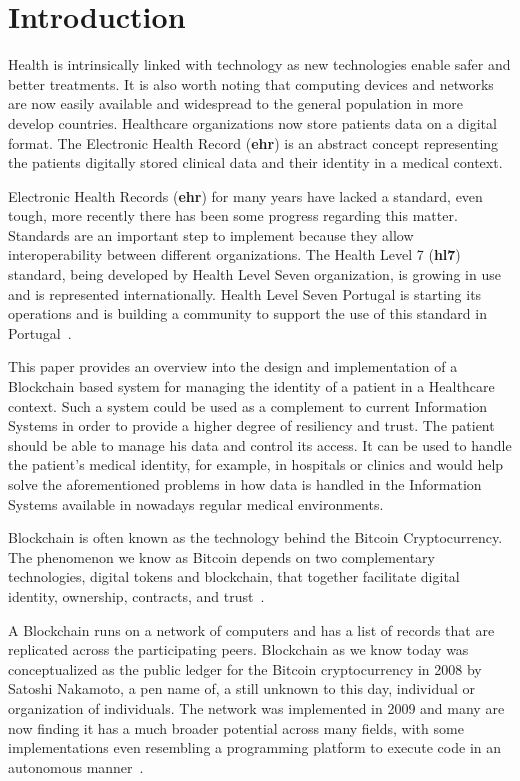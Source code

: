 \chapter{Introduction}\label{introduction}

Health is intrinsically linked with technology as new technologies enable safer
and better treatments. It is also worth noting that computing devices and
networks are now easily available and widespread to the general population in
more develop countries. Healthcare organizations now store patients data on a
digital format. The Electronic Health Record (\textbf{ehr}) is an abstract
concept representing the patients digitally stored clinical data and their
identity in a medical context.

Electronic Health Records (\textbf{ehr}) for many years have lacked a standard,
even tough, more recently there has been some progress regarding this matter.
Standards are an important step to implement because they allow
interoperability between different organizations. The Health Level 7
(\textbf{hl7}) standard, being developed by Health Level Seven organization, is
growing in use and is represented internationally. Health Level Seven Portugal
is starting its operations and is building a community to support the use of
this standard in Portugal~\cite{HealthLevel7}.

This paper provides an overview into the design and implementation of a
Blockchain based system for managing the identity of a patient in a Healthcare
context. Such a system could be used as a complement to current Information
Systems in order to provide a higher degree of resiliency and trust. The
patient should be able to manage his data and control its access. It can be
used to handle the patient’s medical identity, for example, in hospitals or
clinics and would help solve the aforementioned problems in how data is handled
in the Information Systems available in nowadays regular medical environments.

Blockchain is often known as the technology behind the Bitcoin Cryptocurrency.
The phenomenon we know as Bitcoin depends on two complementary technologies,
digital tokens and blockchain, that together facilitate digital identity,
ownership, contracts, and trust~\cite{Evans2016}.

A Blockchain runs on a network of computers and has a list of records that are
replicated across the participating peers. Blockchain as we know today was
conceptualized as the public ledger for the Bitcoin cryptocurrency in 2008 by
Satoshi Nakamoto, a pen name of, a still unknown to this day, individual or
organization of individuals. The network was implemented in 2009 and many are
now finding it has a much broader potential across many fields, with some
implementations even resembling a programming platform to execute code in an
autonomous manner~\cite{Nakamoto2008}.

